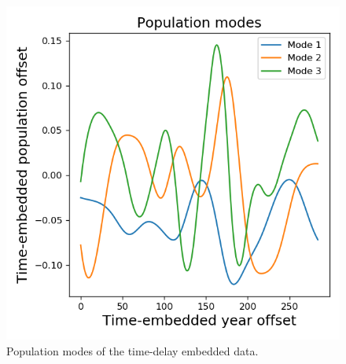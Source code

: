 \documentclass[letterpaper, 10 pt, conference]{ieeeconf}  %
\begin{document}
\begin{figure}[htb] 
\centering
\includegraphics[width=0.97\columnwidth]{images/time_delayed_population_mode.png}
\caption{Population modes of the time-delay embedded data.}
\label{fig:time_delayed_pop_mode}
\end{figure}
\end{document}
